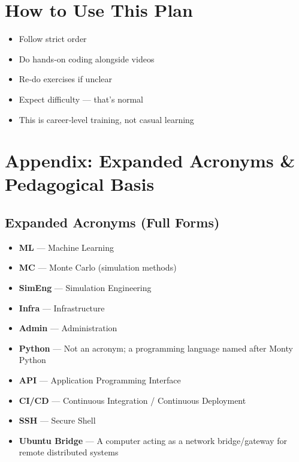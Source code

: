 \documentclass[12pt]{article}
\begin{document}
	\vspace{0.5cm}
	
	\section*{How to Use This Plan}
	\begin{itemize}
		\item Follow strict order
		\item Do hands‑on coding alongside videos
		\item Re‑do exercises if unclear
		\item Expect difficulty — that’s normal
		\item This is career‑level training, not casual learning
	\end{itemize}
	
	\newpage
	
	\section*{Appendix: Expanded Acronyms \& Pedagogical Basis}
	
	\subsection*{Expanded Acronyms (Full Forms)}
	\begin{itemize}
		\item \textbf{ML} — Machine Learning
		\item \textbf{MC} — Monte Carlo (simulation methods)
		\item \textbf{SimEng} — Simulation Engineering
		\item \textbf{Infra} — Infrastructure
		\item \textbf{Admin} — Administration
		\item \textbf{Python} — Not an acronym; a programming language named after Monty Python
		\item \textbf{API} — Application Programming Interface
		\item \textbf{CI/CD} — Continuous Integration / Continuous Deployment
		\item \textbf{SSH} — Secure Shell
		\item \textbf{Ubuntu Bridge} — A computer acting as a network bridge/gateway for remote distributed systems
	\end{itemize}
	
\end{document}
